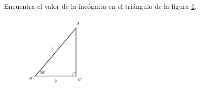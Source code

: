 Encuentra el valor de la incógnita en el triángulo de la figura \ref{fig:lados_functrig_17}.
\begin{figure}[H]
    \begin{center}
        \includegraphics[width=0.3\textwidth]{../images/lados_functrig_17.png}
    \end{center}
    \caption{}
    \label{fig:lados_functrig_17}
\end{figure}